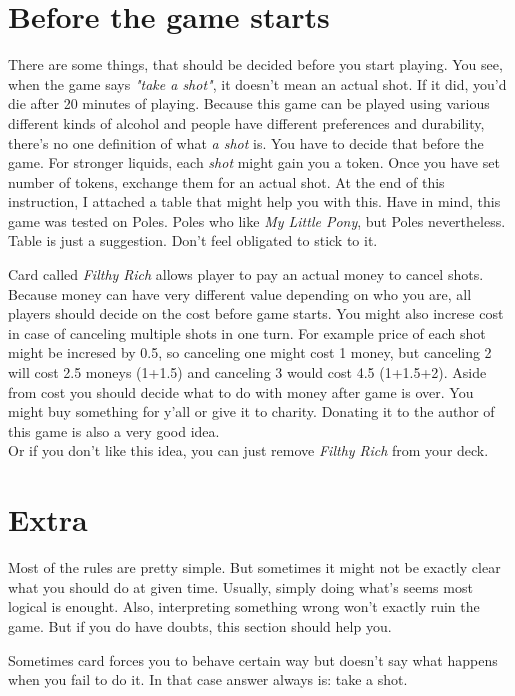 \documentclass[notitlepage]{article}
\begin{document}
\section{Before the game starts}
There are some things, that should be decided before you start playing. You see, when the game says \textsl{"take a shot"}, it doesn't mean an actual shot. If it did, you'd die after 20 minutes of playing. Because this game can be played using various different kinds of alcohol and people have different preferences and durability, there's no one definition of what \textsl{a shot} is. You have to decide that before the game. For stronger liquids, each \textsl{shot} might gain you a token. Once you have set number of tokens, exchange them for an actual shot. At the end of this instruction, I attached a table that might help you with this. Have in mind, this game was tested on Poles. Poles who like \textsl{My Little Pony}, but Poles nevertheless. Table is just a suggestion. Don't feel obligated to stick to it.

Card called \textsl{Filthy Rich} allows player to pay an actual money to cancel shots. Because money can have very different value depending on who you are, all players should decide on the cost before game starts. You might also increse cost in case of canceling multiple shots in one turn. For example price of each shot might be incresed by 0.5, so canceling one might cost 1 money, but canceling 2 will cost 2.5 moneys (1+1.5) and canceling 3 would cost 4.5 (1+1.5+2).\newline
Aside from cost you should decide what to do with money after game is over. You might buy something for y'all or give it to charity. Donating it to the author of this game is also a very good idea. \\
Or if you don't like this idea, you can just remove \textsl{Filthy Rich} from your deck.

\section{Extra}
Most of the rules are pretty simple. But sometimes it might not be exactly clear what you should do at given time. Usually, simply doing what's seems most logical is enought. Also, interpreting something wrong won't exactly ruin the game. But if you do have doubts, this section should help you.

Sometimes card forces you to behave certain way but doesn't say what happens when you fail to do it. In that case answer always is: take a shot.
\end{document}
